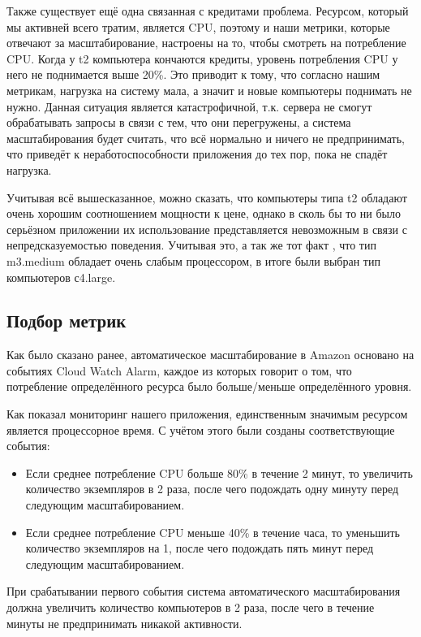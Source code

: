 	Также существует ещё одна связанная с кредитами проблема. Ресурсом, который мы активней всего тратим, является CPU, поэтому и наши метрики, которые отвечают за масштабирование, настроены на то, чтобы смотреть на потребление CPU. Когда у t2 компьютера кончаются кредиты, уровень потребления CPU у него не поднимается выше 20\%. Это приводит к тому, что согласно нашим метрикам, нагрузка на систему мала, а значит и новые компьютеры поднимать не нужно. Данная ситуация является катастрофичной, т.к. сервера не смогут обрабатывать запросы в связи с тем, что они перегружены, а система масштабирования будет считать, что всё нормально и ничего не предпринимать, что приведёт к неработоспособности приложения до тех пор, пока не спадёт нагрузка.
	
	Учитывая всё вышесказанное, можно сказать, что компьютеры типа t2 обладают очень хорошим соотношением мощности к цене, однако в сколь бы то ни было серьёзном приложении их использование представляется невозможным в связи с непредсказуемостью поведения. Учитывая это, а так же тот факт , что тип m3.medium обладает очень слабым процессором, в итоге были выбран тип компьютеров с4.large.
\subsection{Подбор метрик}
	Как было сказано ранее, автоматическое масштабирование в Amazon основано на событиях Cloud Watch Alarm, каждое из которых говорит о том, что потребление определённого ресурса было больше/меньше определённого уровня.
	
	Как показал мониторинг нашего приложения, единственным значимым ресурсом является процессорное время. С учётом этого были созданы соответствующие события:
\begin{itemize}
	\item Если среднее потребление CPU больше 80\% в течение 2 минут, то увеличить количество экземпляров в 2 раза, после чего подождать одну минуту перед следующим масштабированием.
	\item Если среднее потребление CPU меньше 40\% в течение часа, то уменьшить количество экземпляров на 1, после чего подождать пять минут перед следующим масштабированием.
\end{itemize}

	При срабатывании первого события система автоматического масштабирования должна увеличить количество компьютеров в 2 раза, после чего в течение минуты не предпринимать никакой активности.
	
